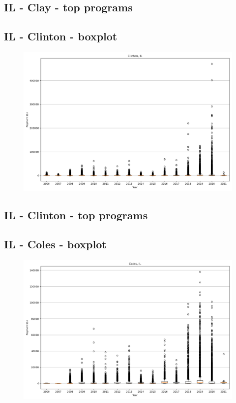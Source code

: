 \subsection*{IL - Clay - top programs}

\newpage
\subsection*{IL - Clinton - boxplot}
\begin{figure}[h]
\centering
\includegraphics[width=7in]{../output/boxplots/counties/Clinton-IL_boxplot.png}
\end{figure}


\subsection*{IL - Clinton - top programs}

\newpage
\subsection*{IL - Coles - boxplot}
\begin{figure}[h]
\centering
\includegraphics[width=7in]{../output/boxplots/counties/Coles-IL_boxplot.png}
\end{figure}


